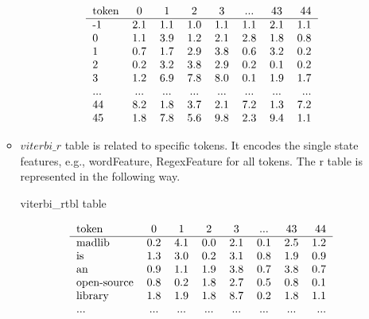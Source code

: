 \begin{itemize}
\begin{itemize}
\begin {table}[h]
  \[\begin{tabular}{l*{6}{c}r}
   token             & 0   & 1   & 2   & 3   & ... & 43 &  44 \\
   \hline
  -1                 & 2.1 & 1.1 & 1.0 & 1.1 & 1.1 & 2.1 & 1.1  \\
   0                 & 1.1 & 3.9 & 1.2 & 2.1 & 2.8 & 1.8 & 0.8  \\
   1                 & 0.7 & 1.7 & 2.9 & 3.8 & 0.6 & 3.2 & 0.2  \\
   2                 & 0.2 & 3.2 & 3.8 & 2.9 & 0.2 & 0.1 & 0.2  \\
   3                 & 1.2 & 6.9 & 7.8 & 8.0 & 0.1 & 1.9 & 1.7  \\
   ...               & ... & ... & ... & ... & ... & ... & ...  \\
   44                & 8.2 & 1.8 & 3.7 & 2.1 & 7.2 & 1.3 & 7.2  \\
   45                & 1.8 & 7.8 & 5.6 & 9.8 & 2.3 & 9.4 & 1.1  \\
  \end{tabular}\]
\end{table}

  \item 
  $viterbi\_r$ table
  is related to specific tokens. It encodes the single state features,
  e.g., wordFeature, RegexFeature for all tokens. The r table is represented
  in the following way.\\
\begin {table}[h]
\caption {viterbi\_rtbl table} \label{tab:title} 

  \[\begin{tabular}{l*{6}{c}r}
   token             & 0   & 1   & 2   & 3   & ... & 43 &  44 \\
   \hline
   madlib            & 0.2 & 4.1 & 0.0 & 2.1 & 0.1 & 2.5 & 1.2  \\
   is                & 1.3 & 3.0 & 0.2 & 3.1 & 0.8 & 1.9 & 0.9  \\
   an                & 0.9 & 1.1 & 1.9 & 3.8 & 0.7 & 3.8 & 0.7  \\
   open-source       & 0.8 & 0.2 & 1.8 & 2.7 & 0.5 & 0.8 & 0.1  \\
   library           & 1.8 & 1.9 & 1.8 & 8.7 & 0.2 & 1.8 & 1.1  \\
   ...               & ... & ... & ... & ... & ... & ... & ...  \\
  \end{tabular}\]
\end{table}
\end{itemize}



\end{itemize}
